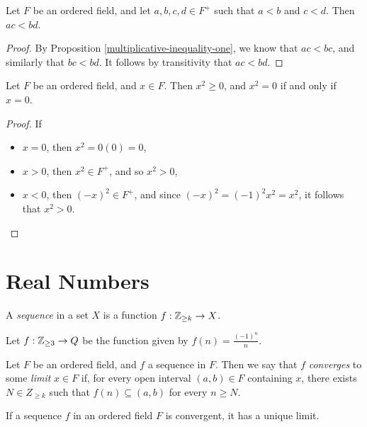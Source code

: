 \begin{prop}\label{multiplicative-inequality-two}
    Let $F$ be an ordered field, and let $a, b, c, d \in F^+$ such that $a < b$ and $c < d$. Then $ac < bd$.
\end{prop}

\begin{proof}
    By Proposition \ref{multiplicative-inequality-one}, we know that $ac < bc$, and similarly that $bc < bd$. It follows by transitivity that $ac < bd$.
\end{proof}

\begin{prop}\label{square-is-positive-or-zero}
    Let $F$ be an ordered field, and $x \in F$. Then $x^2 \geq 0$, and $x^2 = 0$ if and only if $x = 0$.
\end{prop}

\begin{proof}
    If
    \begin{itemize}
        \item $x = 0$, then $x^2 = 0(0) = 0$,
        \item $x > 0$, then $x^2 \in F^+$, and so $x^2 > 0$,
        \item $x < 0$, then $(-x)^2 \in F^+$, and since $(-x)^2 = (-1)^2x^2 = x^2$, it follows that $x^2 > 0$.
    \end{itemize}
\end{proof}

\section{Real Numbers}

\begin{defn}
    A \emph{sequence} in a set $X$ is a function $f: \mathbb{Z}_{\geq k} \to X$.
\end{defn}

\begin{exmp}
    Let $f: \mathbb{Z}_{\geq 3} \to Q$ be the function given by $f(n) = \frac{(-1)^n}{n}$.
\end{exmp}

\begin{defn}
    Let $F$ be an ordered field, and $f$ a sequence in $F$. Then we say that $f$ \emph{converges} to some \emph{limit} $x \in F$ if, for every open interval $(a, b) \in F$ containing $x$, there exists $N \in Z_{\geq k}$ such that $f(n) \subseteq (a, b)$ for every $n \geq N$.
\end{defn}

\begin{thm}
    If a sequence $f$ in an ordered field $F$ is convergent, it has a unique limit.
\end{thm}

